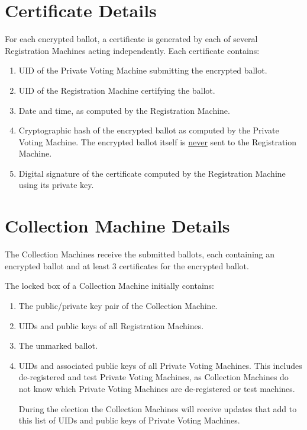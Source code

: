 \documentclass[12pt]{article}
\begin{document}
\section{Certificate Details}
\label{CERTIFICATE-DETAILS}

For each encrypted ballot, a certificate is generated
by each of several Registration Machines acting independently.  Each certificate
contains:
\begin{enumerate}
\item UID of the Private Voting Machine submitting the encrypted ballot.
\item UID of the Registration Machine certifying the ballot.
\item Date and time, as computed by the Registration Machine.
\item Cryptographic hash of the encrypted ballot as computed by the
      Private Voting Machine.  The encrypted ballot itself is
      \underline{never} sent to the Registration Machine.
\item Digital signature of the certificate computed
by the Registration Machine using its private key.
\end{enumerate}

\section{Collection Machine Details}

The Collection Machines receive the submitted ballots, each containing
an encrypted ballot and at least 3 certificates for the encrypted
ballot.

The locked box of a Collection Machine initially contains:
\begin{enumerate}
\item The public/private key pair of the Collection Machine.
\item UIDs and public keys of all Registration Machines.
\item The unmarked ballot.
\item UIDs and associated public keys of all Private Voting
Machines.  This includes de-registered and test Private Voting
Machines, as Collection Machines do not know which Private Voting
Machines are de-registered or test machines.

During the election the Collection Machines will receive updates
that add to this list of UIDs and public keys of Private Voting
Machines.
\setcounter{CML-COUNTER}{\value{enumi}}
\end{enumerate}
\end{document}
